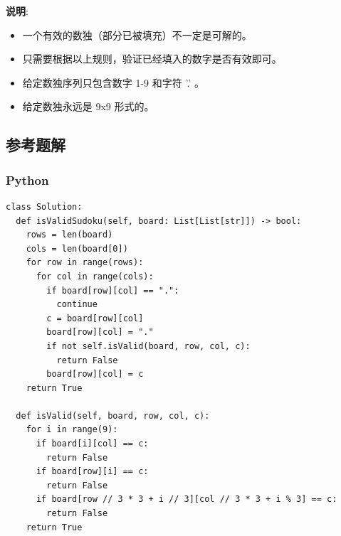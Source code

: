 \textbf{说明}:

\begin{itemize}
  \item 一个有效的数独（部分已被填充）不一定是可解的。
  \item 只需要根据以上规则，验证已经填入的数字是否有效即可。
  \item 给定数独序列只包含数字 1-9 和字符 '.' 。
  \item 给定数独永远是 9x9 形式的。
\end{itemize}

\subsection{参考题解}

\subsubsection{Python}

\begin{verbatim}
class Solution:
  def isValidSudoku(self, board: List[List[str]]) -> bool:
    rows = len(board)
    cols = len(board[0])
    for row in range(rows):
      for col in range(cols):
        if board[row][col] == ".":
          continue
        c = board[row][col]
        board[row][col] = "."
        if not self.isValid(board, row, col, c):
          return False
        board[row][col] = c
    return True

  def isValid(self, board, row, col, c):
    for i in range(9):
      if board[i][col] == c:
        return False
      if board[row][i] == c:
        return False
      if board[row // 3 * 3 + i // 3][col // 3 * 3 + i % 3] == c:
        return False
    return True
\end{verbatim}
